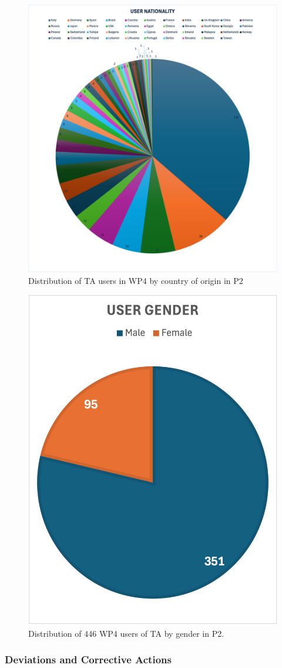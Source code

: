 \begin{figure}[!h]
    \centering
    \includegraphics[width=0.75\linewidth]{P2-nationality.png}
    \caption{Distribution of TA users in WP4 by country of origin in P2}
    \label{fig:WP4-nationality}
\end{figure}

\begin{figure}[!h]
    \centering
    \includegraphics[width=0.5\linewidth]{P2-gender.png}
    \caption{Distribution of 446 WP4 users of TA by gender in P2.}
    \label{fig:WP4-gender}
\end{figure}

\subsubsection*{Deviations and Corrective Actions}
\label{sec:wp4_deviations}

